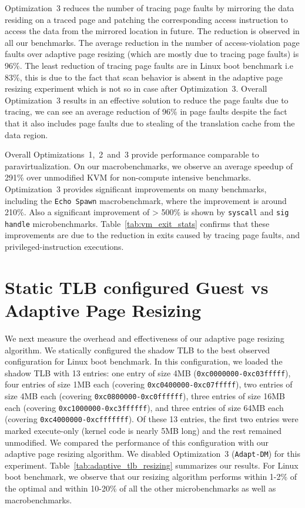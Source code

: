 Optimization~3 reduces the number of tracing page faults by mirroring the data residing on a traced page and patching the corresponding access instruction to access the data from the mirrored location in future. The reduction is observed in all our benchmarks. The average reduction in the number of access-violation page faults over adaptive page resizing (which are mostly due to tracing page faults) is 96\%. The least reduction of tracing page faults are in Linux boot benchmark i.e 83\%, this is due to the fact that scan behavior is absent in the adaptive page resizing experiment which is not so in case after Optimization~3. Overall Optimization~3 results in an effective solution to reduce the page faults due to tracing, we can see an average reduction of 96\% in page faults despite the fact that it also includes page faults due to stealing of the translation cache from the data region.

Overall Optimizations~1,~2~and~3 provide performance comparable to paravirtualization. On our macrobenchmarks, we observe an average speedup of 291\% over unmodified KVM for non-compute intensive benchmarks. Optimization~3 provides significant improvements on many benchmarks, including the {\tt Echo Spawn} macrobenchmark, where the improvement is around 210\%. Also a significant improvement of > 500\% is shown by {\tt syscall} and {\tt sig handle} microbenchmarks. Table~\ref{tab:vm_exit_stats} confirms that these improvements are due to the reduction in exits caused by tracing page faults, and privileged-instruction executions.

\section{Static TLB configured Guest vs Adaptive Page Resizing}
\label{adaptive_pr_results}
We next measure the overhead and effectiveness of our adaptive page resizing algorithm. We statically configured the shadow TLB to the best observed configuration for Linux boot benchmark. In this configuration, we loaded the shadow TLB with 13 entries: one entry of size 4MB ({\tt 0xc0000000-0xc03fffff}), four entries of size 1MB each (covering {\tt 0xc0400000-0xc07fffff}), two entries of size 4MB each (covering {\tt 0xc0800000-0xc0ffffff}), three entries of size 16MB each (covering {\tt 0xc1000000-0xc3ffffff}), and three entries of size 64MB each (covering {\tt 0xc4000000-0xcfffffff}). Of these 13 entries, the first two entries were marked execute-only (kernel code is nearly 5MB long) and the rest remained unmodified. We compared the performance of this configuration with our adaptive page resizing algorithm. We disabled Optimization~3 ({\tt Adapt-DM}) for this experiment. Table~\ref{tab:adaptive_tlb_resizing} summarizes our results. For Linux boot benchmark, we observe that our resizing algorithm performs within 1-2\% of the optimal and within 10-20\% of all the other microbenchmarks as well as macrobenchmarks.


